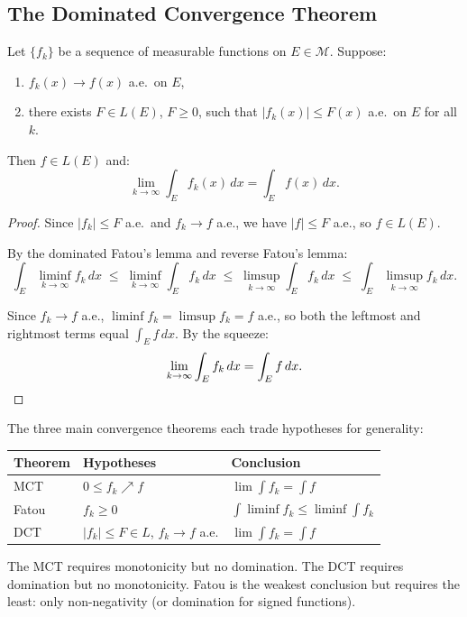 \documentclass[11pt]{report}
\begin{document}
\subsection{The Dominated Convergence Theorem}

\begin{thmbox}
Let $\{f_k\}$ be a sequence of measurable functions on $E \in \mathcal{M}$. Suppose:
\begin{enumerate}[label=(\roman*)]
\item $f_k(x) \to f(x)$ a.e.\ on $E$,
\item there exists $F \in L(E)$, $F \geq 0$, such that $|f_k(x)| \leq F(x)$ a.e.\ on $E$ for all $k$.
\end{enumerate}
Then $f \in L(E)$ and:
\[
\lim_{k \to \infty} \int_E f_k(x)\,dx = \int_E f(x)\,dx.
\]
\end{thmbox}

\begin{proof}
Since $|f_k| \leq F$ a.e.\ and $f_k \to f$ a.e., we have $|f| \leq F$ a.e., so $f \in L(E)$.

By the dominated Fatou's lemma and reverse Fatou's lemma:
\[
\int_E \liminf_{k \to \infty} f_k\,dx \;\leq\; \liminf_{k \to \infty} \int_E f_k\,dx \;\leq\; \limsup_{k \to \infty} \int_E f_k\,dx \;\leq\; \int_E \limsup_{k \to \infty} f_k\,dx.
\]

Since $f_k \to f$ a.e., $\liminf f_k = \limsup f_k = f$ a.e., so both the leftmost and rightmost terms equal $\int_E f\,dx$. By the squeeze:
\[
\lim_{k \to \infty} \int_E f_k\,dx = \int_E f\,dx. \qedhere
\]
\end{proof}

\begin{rembox}
The three main convergence theorems each trade hypotheses for generality:

\begin{center}
\renewcommand{\arraystretch}{1.4}
\begin{tabular}{lll}
\textbf{Theorem} & \textbf{Hypotheses} & \textbf{Conclusion} \\
\hline
MCT & $0 \leq f_k \nearrow f$ & $\lim \int f_k = \int f$ \\
Fatou & $f_k \geq 0$ & $\int \liminf f_k \leq \liminf \int f_k$ \\
DCT & $|f_k| \leq F \in L$, $f_k \to f$ a.e. & $\lim \int f_k = \int f$ \\
\end{tabular}
\end{center}

The MCT requires monotonicity but no domination. The DCT requires domination but no monotonicity. Fatou is the weakest conclusion but requires the least: only non-negativity (or domination for signed functions).
\end{rembox}
\end{document}
